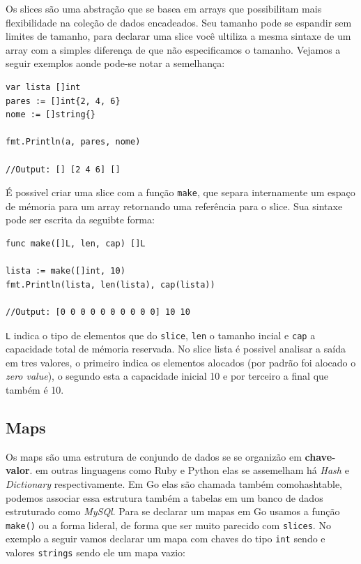 \documentclass{SBCbookchapter}
\begin{document}
Os slices são uma abstração que se basea em arrays que possibilitam mais flexibilidade na coleção de dados encadeados. Seu tamanho pode se espandir sem limites de tamanho, para declarar uma slice você ultiliza a mesma sintaxe de um array com a simples diferença de que não especificamos o tamanho. Vejamos a seguir exemplos aonde pode-se notar a semelhança:


\begin{lstlisting}
var lista []int
pares := []int{2, 4, 6}
nome := []string{}

fmt.Println(a, pares, nome)

//Output: [] [2 4 6] []
\end{lstlisting}

É possivel criar uma slice com a função \texttt{make}, que separa internamente um espaço de mémoria para um array retornando uma referência para o slice. Sua sintaxe pode ser escrita da seguibte forma:

\begin{lstlisting}
func make([]L, len, cap) []L

lista := make([]int, 10)
fmt.Println(lista, len(lista), cap(lista))

//Output: [0 0 0 0 0 0 0 0 0 0] 10 10

\end{lstlisting}

\texttt{L} indica o tipo de elementos que do \texttt{slice}, \texttt{len} o tamanho incial e \texttt{cap} a capacidade total de mémoria reservada. No slice lista é possivel analisar a saída em tres valores, o primeiro indica os elementos alocados (por padrão foi alocado o \textit{zero value}), o segundo esta a capacidade inicial 10 e por terceiro a final que também é 10.  

\subsection{Maps}

Os maps são uma estrutura de conjundo de dados se se organizão em \textbf{chave-valor}. em outras linguagens como Ruby e Python elas se assemelham há \textit{Hash} e \textit{Dictionary} respectivamente. Em Go elas são chamada também comohashtable, podemos associar essa estrutura também a tabelas em um banco de dados estruturado como \textit{MySQl}. Para se declarar um mapas em Go usamos a função \texttt{make()} ou a forma lideral, de forma que ser muito parecido com \texttt{slices}. No exemplo a seguir vamos declarar um mapa com chaves do tipo \texttt{int} sendo e valores \texttt{strings} sendo ele um mapa vazio:
\end{document}

